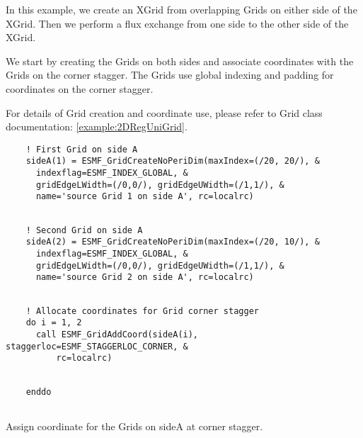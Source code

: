    In this example, we create an XGrid from overlapping Grids on
   either side of the XGrid. Then we perform a flux exchange from one side
   to the other side of the XGrid.
  
   We start by creating the Grids on both sides and associate coordinates with
   the Grids on the corner stagger. The Grids use global indexing and padding
   for coordinates on the corner stagger.
  
   For details of Grid creation and coordinate use,
   please refer to Grid class documentation: \ref{example:2DRegUniGrid}. 

 \begin{verbatim}
    ! First Grid on side A
    sideA(1) = ESMF_GridCreateNoPeriDim(maxIndex=(/20, 20/), &
      indexflag=ESMF_INDEX_GLOBAL, &
      gridEdgeLWidth=(/0,0/), gridEdgeUWidth=(/1,1/), &
      name='source Grid 1 on side A', rc=localrc)
 
\end{verbatim}
 

 \begin{verbatim}
    ! Second Grid on side A
    sideA(2) = ESMF_GridCreateNoPeriDim(maxIndex=(/20, 10/), &
      indexflag=ESMF_INDEX_GLOBAL, &
      gridEdgeLWidth=(/0,0/), gridEdgeUWidth=(/1,1/), &
      name='source Grid 2 on side A', rc=localrc)
 
\end{verbatim}
 

 \begin{verbatim}
    ! Allocate coordinates for Grid corner stagger
    do i = 1, 2
      call ESMF_GridAddCoord(sideA(i), staggerloc=ESMF_STAGGERLOC_CORNER, &
          rc=localrc)
 
\end{verbatim}
 

 \begin{verbatim}
    enddo
 
\end{verbatim}
 

   Assign coordinate for the Grids on sideA at corner stagger. 

